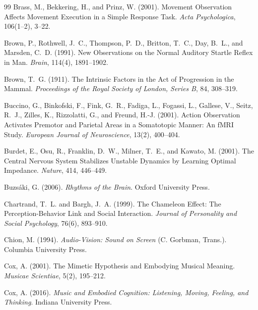 \documentclass[11pt]{article}
\theoremstyle{plain}
\theoremstyle{definition}
\begin{document}
\begin{thebibliography}{99}
Brass, M., Bekkering, H., and Prinz, W. (2001).
Movement Observation Affects Movement Execution in a Simple Response Task.
\textit{Acta Psychologica}, 106(1--2), 3--22.

Brown, P., Rothwell, J.~C., Thompson, P.~D., Britton, T.~C., Day, B.~L., and Marsden, C.~D. (1991).
New Observations on the Normal Auditory Startle Reflex in Man.
\textit{Brain}, 114(4), 1891--1902.

Brown, T.~G. (1911).
The Intrinsic Factors in the Act of Progression in the Mammal.
\textit{Proceedings of the Royal Society of London, Series B}, 84, 308--319.

Buccino, G., Binkofski, F., Fink, G.~R., Fadiga, L., Fogassi, L., Gallese, V., Seitz, R.~J., Zilles, K., Rizzolatti, G., and Freund, H.-J. (2001).
Action Observation Activates Premotor and Parietal Areas in a Somatotopic Manner: An fMRI Study.
\textit{European Journal of Neuroscience}, 13(2), 400--404.

Burdet, E., Osu, R., Franklin, D.~W., Milner, T.~E., and Kawato, M. (2001).
The Central Nervous System Stabilizes Unstable Dynamics by Learning Optimal Impedance.
\textit{Nature}, 414, 446--449.

Buzs\'aki, G. (2006).
\textit{Rhythms of the Brain}.
Oxford University Press.

Chartrand, T.~L. and Bargh, J.~A. (1999).
The Chameleon Effect: The Perception-Behavior Link and Social Interaction.
\textit{Journal of Personality and Social Psychology}, 76(6), 893--910.

Chion, M. (1994).
\textit{Audio-Vision: Sound on Screen} (C. Gorbman, Trans.).
Columbia University Press.

Cox, A. (2001).
The Mimetic Hypothesis and Embodying Musical Meaning.
\textit{Musicae Scientiae}, 5(2), 195--212.

Cox, A. (2016).
\textit{Music and Embodied Cognition: Listening, Moving, Feeling, and Thinking}.
Indiana University Press.


\end{thebibliography}
\end{document}
